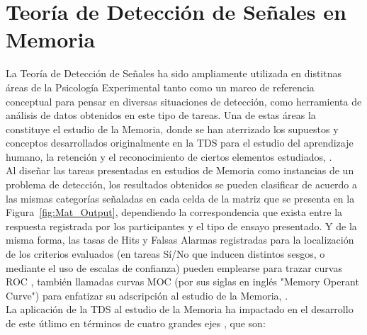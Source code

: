 

















\section{Teoría de Detección de Señales en Memoria}

La Teoría de Detección de Señales ha sido ampliamente utilizada en distitnas áreas de la Psicología Experimental tanto como un marco de referencia conceptual para pensar en diversas situaciones de detección, como herramienta de análisis de datos obtenidos en este tipo de tareas. Una de estas áreas la constituye el estudio de la Memoria, donde se han aterrizado los supuestos y conceptos desarrollados originalmente en la TDS para el estudio del aprendizaje humano, la retención y el reconocimiento de ciertos elementos estudiados, \parencite{Murdock1965, Bernbach1967, Banks1970, White1999}.\\

Al diseñar las tareas presentadas en estudios de Memoria como instancias de un problema de detección, los resultados obtenidos se pueden clasificar de acuerdo a las mismas categorías señaladas en cada celda de la matriz que se presenta en la Figura~\ref{fig:Mat_Output}, dependiendo la correspondencia que exista entre la respuesta registrada por los participantes y el tipo de ensayo presentado. Y de la misma forma, las tasas de Hits y Falsas Alarmas registradas para la localización de los criterios evaluados (en tareas Sí/No que inducen distintos sesgos, o mediante el uso de escalas de confianza) pueden emplearse para trazar curvas ROC \parencite{Egan1958}, también llamadas curvas MOC (por sus siglas en inglés "Memory Operant Curve") para enfatizar su adscripción al estudio de la Memoria, \parencite{Norman1965, KintschCarlson1967}.\\

La aplicación de la TDS al estudio de la Memoria ha impactado en el desarrollo de este útlimo en términos de cuatro grandes ejes \parencite{Banks1970}, que son:\\

